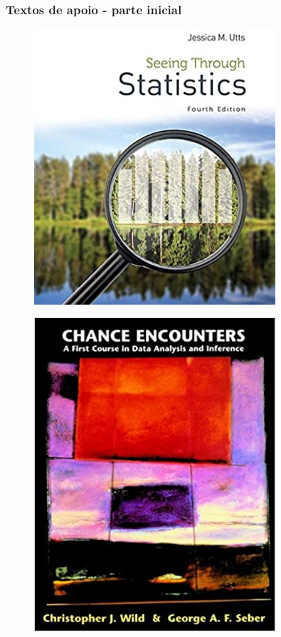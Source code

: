 \documentclass[handout,serif, professionalfont, usenames, dvipsnames, aspectratio = 169]{beamer}\usepackage[]{graphicx}\usepackage[]{color}
\begin{document}
\begin{frame}
  \frametitle{Textos de apoio - parte inicial}
\begin{figure}
\centering
\begin{minipage}{.33\textwidth}
  \centering
  \includegraphics[width=0.8\textwidth]{./pics/SeeingStatistics.jpg}
  \label{fig:utts}
\end{minipage}%
\begin{minipage}{.33\textwidth}
  \centering
  \includegraphics[width=0.8\textwidth]{./pics/ChanceEncounters.jpg}

\end{minipage}
\end{figure}
\end{frame}
\end{document}
